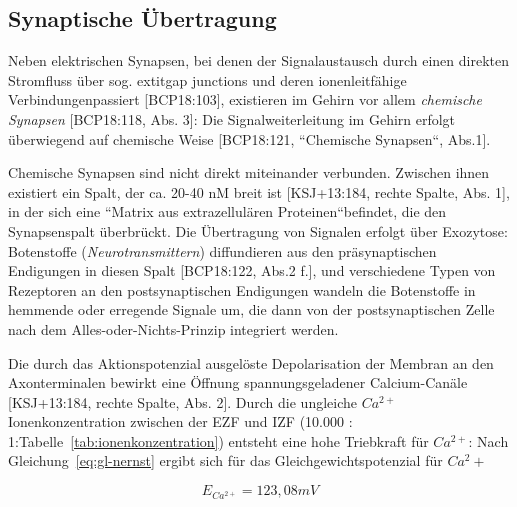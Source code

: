{{\subsection{Synaptische Übertragung}\label{synaptischeuebertragung}
Neben elektrischen Synapsen, bei denen der Signalaustausch durch einen direkten Stromfluss über sog.  	extit{gap junctions} und deren ionenleitfähige Verbindungen\footnotemark[54] passiert [BCP18:103], existieren im Gehirn vor allem \textit{chemische Synapsen} [BCP18:118, Abs. 3]: Die Signalweiterleitung im Gehirn erfolgt überwiegend auf chemische Weise [BCP18:121, ``Chemische Synapsen``, Abs.1].

Chemische Synapsen sind nicht direkt miteinander verbunden. 
Zwischen ihnen existiert ein Spalt, der ca. 20-40 nM breit ist [KSJ+13:184, rechte Spalte, Abs. 1], in der sich eine ``Matrix aus extrazellulären Proteinen`` befindet, die den Synapsenspalt überbrückt. 
Die Übertragung von Signalen erfolgt über Exozytose: Botenstoffe (\textit{Neurotransmittern}) diffundieren  aus den präsynaptischen Endigungen in diesen Spalt [BCP18:122, Abs.2 f.], und verschiedene Typen von Rezeptoren an den postsynaptischen Endigungen wandeln die Botenstoffe in hemmende oder erregende Signale um, die dann von der postsynaptischen Zelle nach dem Alles-oder-Nichts-Prinzip integriert werden.

Die durch das Aktionspotenzial ausgelöste Depolarisation der Membran an den Axonterminalen bewirkt eine Öffnung spannungsgeladener Calcium-Canäle [KSJ+13:184, rechte Spalte, Abs. 2].
Durch die ungleiche $Ca^{2+}$ Ionenkonzentration zwischen der EZF und IZF (10.000 : 1:Tabelle~\ref{tab:ionenkonzentration}) entsteht eine hohe Triebkraft für $Ca^{2+}$: Nach Gleichung~\ref{eq:gl-nernst} ergibt sich für das Gleichgewichtspotenzial für $Ca^2+$

\begin{equation}
 E_{Ca^{2+}} = 123,08 mV
 \label{eq:gl-eqca2}
\end{equation}


}}
